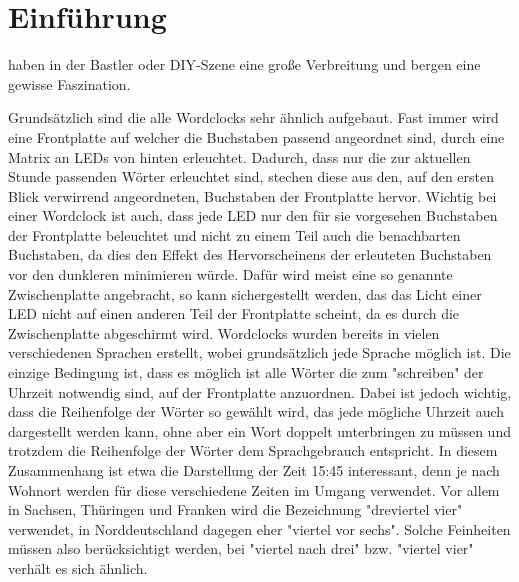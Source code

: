 \documentclass[12pt,journal,compsoc]{IEEEtran}
\begin{document}
%


\section{Einführung}

 haben in der Bastler oder DIY-Szene eine große Verbreitung und bergen eine gewisse Faszination. 


Grundsätzlich sind die alle Wordclocks sehr ähnlich aufgebaut. Fast immer wird eine Frontplatte auf welcher die Buchstaben passend angeordnet sind, durch eine Matrix an LEDs von hinten erleuchtet. Dadurch, dass nur die zur aktuellen Stunde passenden   Wörter erleuchtet sind, stechen diese aus den, auf den ersten Blick verwirrend angeordneten, Buchstaben der Frontplatte hervor. Wichtig bei einer Wordclock ist auch, dass jede LED nur den für sie vorgesehen Buchstaben der Frontplatte beleuchtet und nicht zu einem Teil auch die benachbarten Buchstaben, da dies den Effekt des Hervorscheinens der erleuteten Buchstaben vor den dunkleren minimieren würde. Dafür wird meist eine so genannte Zwischenplatte angebracht, so kann sichergestellt werden, das das Licht  einer LED  nicht  auf einen anderen Teil der Frontplatte scheint, da es durch die Zwischenplatte abgeschirmt wird.
Wordclocks wurden bereits in vielen verschiedenen Sprachen erstellt, wobei  grundsätzlich jede Sprache möglich ist. Die einzige Bedingung ist, dass es möglich ist alle Wörter die zum "schreiben" der Uhrzeit notwendig sind, auf der Frontplatte anzuordnen. Dabei ist jedoch wichtig, dass die Reihenfolge der Wörter so gewählt wird, das jede mögliche Uhrzeit auch dargestellt werden kann, ohne aber ein Wort doppelt unterbringen zu müssen und trotzdem die Reihenfolge der Wörter dem Sprachgebrauch entspricht. In diesem Zusammenhang ist etwa die Darstellung der Zeit 15:45 interessant, denn je nach Wohnort werden für diese verschiedene Zeiten im Umgang verwendet. Vor allem in Sachsen, Thüringen und Franken wird die Bezeichnung "dreviertel vier" verwendet, in Norddeutschland dagegen eher "viertel vor sechs". Solche Feinheiten müssen also berücksichtigt werden,  bei "viertel nach drei" bzw. "viertel vier" verhält es sich ähnlich.
\end{document}
